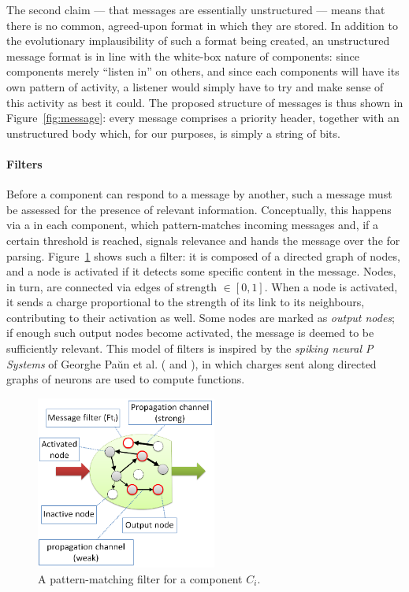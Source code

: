 The second claim --- that messages are essentially unstructured --- means that there is no common, agreed-upon format in which they are stored. In addition to the evolutionary implausibility of such a format being created, an unstructured message format is in line with the white-box nature of components: since components merely ``listen in'' on others, and since each components will have its own pattern of activity, a listener would simply have to try and make sense of this activity as best it could. The proposed structure of messages is thus shown in Figure~\ref{fig:message}: every message comprises a priority header, together with an unstructured body which, for our purposes, is simply a string of bits.

\paragraph{Filters} Before a component can respond to a message by another, such a message must be assessed for the presence of relevant information. Conceptually, this happens via a  in each component, which pattern-matches incoming messages and, if a certain threshold is reached, signals relevance and hands the message over the  for parsing. Figure~\ref{fig:filter} shows such a filter: it is composed of a directed graph of nodes, and a node is activated if it detects some specific content in the message. Nodes, in turn, are connected via edges of strength $\in [0,1]$. When a node is activated, it sends a charge proportional to the strength of its link to its neighbours, contributing to their activation as well. Some nodes are marked as {\em output nodes}; if enough such output nodes become activated, the message is deemed to be sufficiently relevant. This model of filters is inspired by the {\em spiking neural P Systems} of Georghe Pa\u{u}n et al. (\cite[p. 337]{membraneComputing} and \cite{spikingNeural}), in which charges sent along directed graphs of neurons are used to compute functions.

\begin{figure}[!h]
	\centering
	\includegraphics[width=168pt]{figs/filter.png}
	\caption{A pattern-matching filter for a component $C_i$.}
	\label{fig:filter}
\end{figure}